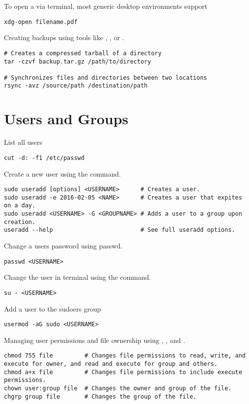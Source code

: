 To open a  via terminal, most generic desktop environments support
\begin{lstlisting}
xdg-open filename.pdf
\end{lstlisting}

Creating backups using tools like , , or .
\begin{lstlisting}
# Creates a compressed tarball of a directory
tar -czvf backup.tar.gz /path/to/directory

# Synchronizes files and directories between two locations
rsync -avz /source/path /destination/path
\end{lstlisting}











\section{Users and Groups}

List all users
\begin{lstlisting}
cut -d: -f1 /etc/passwd
\end{lstlisting}

Create a new user using the  command.
\begin{lstlisting}
sudo useradd [options] <USERNAME>      # Creates a user.
sudo useradd -e 2016-02-05 <NAME>      # Creates a user that expites on a day.
sudo useradd <USERNAME> -G <GROUPNAME> # Adds a user to a group upon creation.
useradd --help                         # See full useradd options.
\end{lstlisting}

Change a users password using passwd.
\begin{lstlisting}
passwd <USERNAME>
\end{lstlisting}

Change the user in terminal using the  command.
\begin{lstlisting}
su - <USERNAME>
\end{lstlisting}

Add a user to the sudoers group
\begin{lstlisting}
usermod -aG sudo <USERNAME>
\end{lstlisting}

Managing user permissions and file ownership using , , and .
\begin{lstlisting}
chmod 755 file         # Changes file permissions to read, write, and execute for owner, and read and execute for group and others.
chmod a+x file         # Changes file permissions to include execute permissions.
chown user:group file  # Changes the owner and group of the file.
chgrp group file       # Changes the group of the file.
\end{lstlisting}












